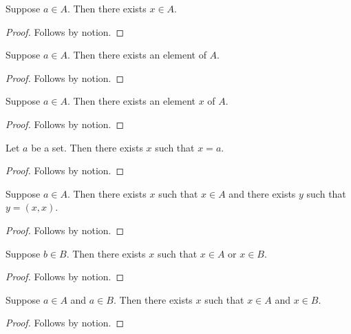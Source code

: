 \begin{proposition}\label{horn_existential_membership}
    Suppose $a\in A$.
    Then there exists $x\in A$.
\end{proposition}
\begin{proof}
    Follows by notion.
\end{proof}

\begin{proposition}\label{horn_existential_noun_anonymous}
    Suppose $a\in A$.
    Then there exists an element of $A$.
\end{proposition}
\begin{proof}
    Follows by notion.
\end{proof}

\begin{proposition}\label{horn_existential_noun_named}
    Suppose $a\in A$.
    Then there exists an element $x$ of $A$.
\end{proposition}
\begin{proof}
    Follows by notion.
\end{proof}

\begin{proposition}\label{horn_existential_equality}
    Let $a$ be a set.
    Then there exists $x$ such that $x=a$.
\end{proposition}
\begin{proof}
    Follows by notion.
\end{proof}

\begin{proposition}\label{horn_existential_nested}
    Suppose $a\in A$.
    Then there exists $x$ such that $x\in A$ and there exists $y$ such that $y=(x,x)$.
\end{proposition}
\begin{proof}
    Follows by notion.
\end{proof}

\begin{proposition}\label{horn_existential_alternative}
    Suppose $b\in B$.
    Then there exists $x$ such that $x\in A$ or $x\in B$.
\end{proposition}
\begin{proof}
    Follows by notion.
\end{proof}

\begin{proposition}\label{horn_existential_conjunction}
    Suppose $a\in A$ and $a\in B$.
    Then there exists $x$ such that $x\in A$ and $x\in B$.
\end{proposition}
\begin{proof}
    Follows by notion.
\end{proof}

